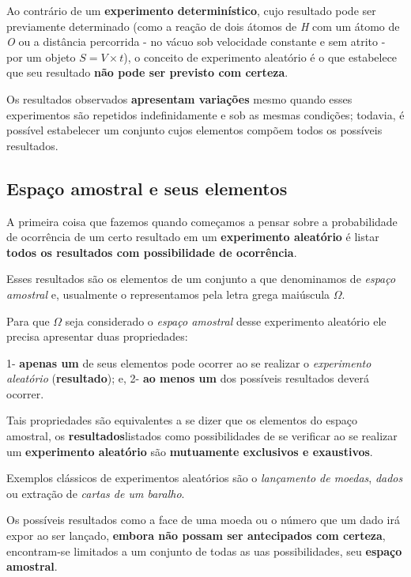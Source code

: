 \documentclass[
]{book}
\begin{document}
Ao contrário de um \textbf{experimento determinístico}, cujo resultado pode ser previamente determinado (como a reação de dois átomos de \emph{H} com um átomo de \emph{O} ou a distância percorrida - no vácuo sob velocidade constante e sem atrito - por um objeto \(S = V \times t\)), o conceito de experimento aleatório é o que estabelece que seu resultado \textbf{não pode ser previsto com certeza}.

Os resultados observados \textbf{apresentam variações} mesmo quando esses experimentos são repetidos indefinidamente e sob as mesmas condições; todavia, é possível estabelecer um conjunto cujos elementos compõem todos os possíveis resultados.

\hypertarget{espauxe7o-amostral-e-seus-elementos}{%
\subsection{Espaço amostral e seus elementos}\label{espauxe7o-amostral-e-seus-elementos}}

\hfill\break
A primeira coisa que fazemos quando começamos a pensar sobre a probabilidade de ocorrência de um certo resultado em um \textbf{experimento aleatório} é listar \textbf{todos os resultados com possibilidade de ocorrência}.

Esses resultados são os elementos de um conjunto a que denominamos de \emph{espaço amostral} e, usualmente o representamos pela letra grega maiúscula \(\Omega\).

Para que \(\Omega\) seja considerado o \emph{espaço amostral} desse experimento aleatório ele precisa apresentar duas propriedades:

1- \textbf{apenas um} de seus elementos pode ocorrer ao se realizar o \emph{experimento aleatório} (\textbf{resultado}); e,
2- \textbf{ao menos um} dos possíveis resultados deverá ocorrer.

Tais propriedades são equivalentes a se dizer que os elementos do espaço amostral, os \textbf{resultados}listados como possibilidades de se verificar ao se realizar um \textbf{experimento aleatório} são \textbf{mutuamente exclusivos e exaustivos}.

Exemplos clássicos de experimentos aleatórios são o \emph{lançamento de moedas}, \emph{dados} ou extração de \emph{cartas de um baralho}.

Os possíveis resultados como a face de uma moeda ou o número que um dado irá expor ao ser lançado, \textbf{embora não possam ser antecipados com certeza}, encontram-se limitados a um conjunto de todas as uas possibilidades, seu \textbf{espaço amostral}.
\end{document}
